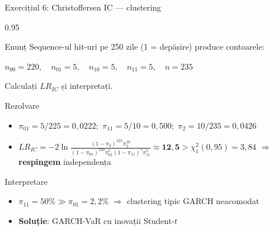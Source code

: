 \documentclass[9pt, aspectratio=169, t]{beamer}
\begin{document}
\begin{frame}[shrink=10]{Exercițiul 6: Christoffersen IC --- clustering}
    \begin{cminipage}{0.95\textwidth}
    \begin{block}{Enunț}
    Sequence-ul hit-uri pe 250 zile (1 = depășire) produce contoarele:
    \begin{center}
    \small
    $n_{00} = 220, \quad n_{01} = 5, \quad n_{10} = 5, \quad n_{11} = 5, \quad n = 235$
    \end{center}
    Calculați $LR_{IC}$ și interpretați.
    \end{block}
    \vspace{0.1cm}
    \begin{exampleblock}{Rezolvare}
    \begin{itemize}\setlength{\itemsep}{0pt}
        \item $\pi_{01} = 5/225 = 0{,}0222$;\, $\pi_{11} = 5/10 = 0{,}500$;\, $\pi_2 = 10/235 = 0{,}0426$
        \item $LR_{IC} = -2\ln\!\frac{(1-\pi_2)^{225}\pi_2^{10}}{(1-\pi_{01})^{220}\pi_{01}^{5}(1-\pi_{11})^{5}\pi_{11}^{5}} \approx \mathbf{12{,}5} > \chi^2_1(0{,}95) = 3{,}84$ $\Rightarrow$ \textbf{respingem} independența
    \end{itemize}
    \end{exampleblock}
    \begin{alertblock}{Interpretare}
    \begin{itemize}\setlength{\itemsep}{0pt}
        \item $\pi_{11} = 50\% \gg \pi_{01} = 2{,}2\%$ $\Rightarrow$ clustering tipic GARCH neacomodat
        \item \textbf{Soluție}: GARCH-VaR cu inovații Student-$t$
    \end{itemize}
    \end{alertblock}
    \end{cminipage}
\end{frame}
\end{document}
